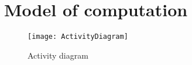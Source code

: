 \chapter{Model of computation}

\begin{figure}[H]
\centering
\texttt{[image: ActivityDiagram]}
\caption{Activity diagram}
\label{fig:ActivityDiagram}
\end{figure}